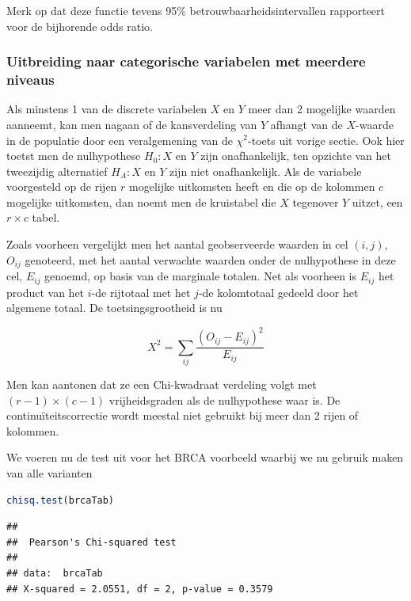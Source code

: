 \documentclass[
  12pt,dutch,coursenotes]{book}
\begin{document}
Merk op dat deze functie tevens 95\% betrouwbaarheidsintervallen rapporteert voor de bijhorende odds ratio.

\hypertarget{uitbreiding-naar-categorische-variabelen-met-meerdere-niveaus}{%
\subsubsection{Uitbreiding naar categorische variabelen met meerdere niveaus}\label{uitbreiding-naar-categorische-variabelen-met-meerdere-niveaus}}

Als minstens 1 van de discrete variabelen \(X\) en \(Y\) meer dan 2 mogelijke
waarden aanneemt, kan men nagaan of de kansverdeling van \(Y\) afhangt van de \(X\)-waarde in de populatie door een veralgemening van de \(\chi^2\)-toets
uit vorige sectie. Ook hier toetst men de nulhypothese \(H_0: X\) en \(Y\) zijn
onafhankelijk, ten opzichte van het tweezijdig alternatief \(H_A: X\) en \(Y\)
zijn niet onafhankelijk. Als de variabele voorgesteld op de rijen \(r\)
mogelijke uitkomsten heeft en die op de kolommen \(c\) mogelijke uitkomsten,
dan noemt men de kruistabel die \(X\) tegenover \(Y\) uitzet, een \(r \times c\)
tabel.

Zoals voorheen vergelijkt men het aantal geobserveerde waarden in cel \((i,j)\), \(O_{ij}\) genoteerd, met het aantal verwachte waarden onder de nulhypothese
in deze cel, \(E_{ij}\) genoemd, op basis van de marginale totalen. Net als
voorheen is \(E_{ij}\) het product van het \(i\)-de rijtotaal met het \(j\)-de
kolomtotaal gedeeld door het algemene totaal. De toetsingsgrootheid is nu

\begin{equation*}
X^2 = \sum_{ij} \frac{\left (O_{ij} - E_{ij}\right)^2 }{ E_{ij}}
\end{equation*}

Men kan aantonen dat ze een Chi-kwadraat verdeling volgt met \((r-1) \times (c-1)\) vrijheidsgraden als de nulhypothese waar is. De continuïteitscorrectie wordt meestal niet gebruikt bij meer dan 2 rijen of
kolommen.

We voeren nu de test uit voor het BRCA voorbeeld waarbij we nu gebruik maken van alle varianten

\begin{lstlisting}[language=R]
chisq.test(brcaTab)
\end{lstlisting}

\begin{lstlisting}
## 
##  Pearson's Chi-squared test
## 
## data:  brcaTab
## X-squared = 2.0551, df = 2, p-value = 0.3579
\end{lstlisting}
\end{document}

